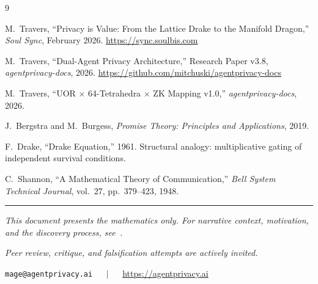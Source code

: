 \documentclass[11pt,a4paper]{article}
\begin{document}

\begin{thebibliography}{9}

M.~Travers, ``Privacy is Value: From the Lattice Drake to the Manifold Dragon,'' \textit{Soul Sync}, February 2026. \url{https://sync.soulbis.com}

M.~Travers, ``Dual-Agent Privacy Architecture,'' Research Paper v3.8, \textit{agentprivacy-docs}, 2026. \url{https://github.com/mitchuski/agentprivacy-docs}

M.~Travers, ``UOR $\times$ 64-Tetrahedra $\times$ ZK Mapping v1.0,'' \textit{agentprivacy-docs}, 2026.

J.~Bergstra and M.~Burgess, \textit{Promise Theory: Principles and Applications}, 2019.

F.~Drake, ``Drake Equation,'' 1961. Structural analogy: multiplicative gating of independent survival conditions.

C.~Shannon, ``A Mathematical Theory of Communication,'' \textit{Bell System Technical Journal}, vol.~27, pp.~379--423, 1948.

\end{thebibliography}

\vfill

\noindent\rule{\textwidth}{0.4pt}

\smallskip

\noindent\textit{This document presents the mathematics only. For narrative context, motivation, and the discovery process, see~\cite{narrative}.}

\smallskip

\noindent\textit{Peer review, critique, and falsification attempts are actively invited.}

\medskip

\begin{center}
\texttt{mage@agentprivacy.ai} $\quad\mid\quad$ \url{https://agentprivacy.ai}
\end{center}
\end{document}
